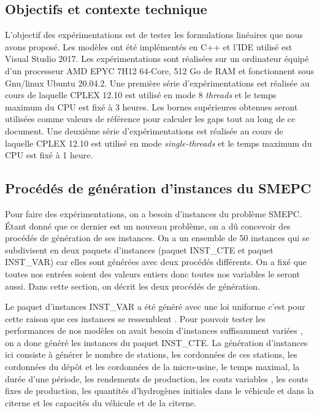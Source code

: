 {\subsection{Objectifs et contexte technique}
L'objectif des expérimentations est de tester les formulations linéaires que nous avons proposé. Les modèles ont été implémentés en C++ et l'IDE utilisé est Visual Studio 2017.
Les expérimentations sont réalisées sur un ordinateur équipé d'un processeur AMD EPYC 7H12 64-Core, 512 Go de RAM et
fonctionnent sous Gnu/linux Ubuntu 20.04.2. Une première série d'expérimentations est réalisée au cours de laquelle CPLEX 12.10 est utilisé en mode 8 \textit{threads} 
et le temps maximum du CPU est fixé à 3 heures. Les bornes supérieures obtenues seront utilisées comme valeurs de référence pour calculer les gaps tout au long de ce document. Une deuxième série d'expérimentations est réalisée au cours de laquelle CPLEX 12.10 est utilisé en mode \textit{single-threads} et le temps maximum du CPU est fixé à 1 heure.%

\subsection{Procédés de génération d'instances du SMEPC}
\label{Gen_instance}
Pour faire des expérimentations, on a besoin d'instances du problème SMEPC. Étant donné que ce dernier est un nouveau problème, on a dû concevoir des procédés de génération de ses instances. On a un ensemble de 50 instances qui se subdivisent en deux paquets d'instances (paquet INST\_CTE et paquet INST\_VAR) car elles sont générées avec deux procédés différents. On a fixé que toutes nos entrées soient des valeurs entiers donc toutes nos variables le seront aussi. Dans cette section, on décrit les deux procédés de génération. 

Le paquet d'instances INST\_VAR a été généré avec une loi uniforme c'est pour cette raison que ces instances se \og ressemblent \fg{}. 
Pour pouvoir tester les performances de nos modèles on avait besoin d'instances suffisamment \og variées \fg{}, on a donc généré les instances du paquet INST\_CTE.
La génération d'instances ici consiste à générer le nombre de stations, les cordonnées de ces stations, les cordonnées du dépôt et les cordonnées de la micro-usine, le temps maximal, la durée d'une période, les rendements de production, les couts variables , les couts fixes de production, les quantités d'hydrogènes initiales dans le véhicule et dans la citerne et les capacités du véhicule et de la citerne.

}
